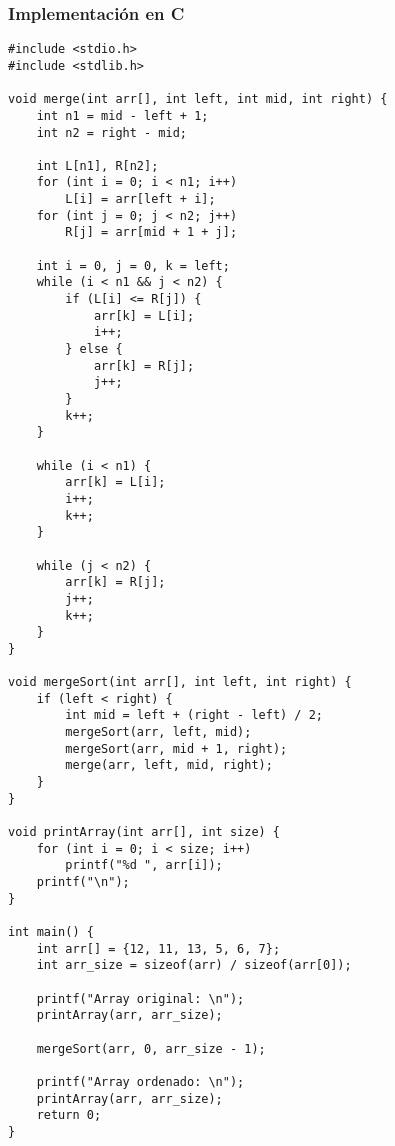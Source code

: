 \documentclass[11pt,openany]{book}
\begin{document}
\subsubsection{Implementación en C}
\lstset{language=C}
\begin{lstlisting}
#include <stdio.h>
#include <stdlib.h>

void merge(int arr[], int left, int mid, int right) {
    int n1 = mid - left + 1;
    int n2 = right - mid;

    int L[n1], R[n2];
    for (int i = 0; i < n1; i++)
        L[i] = arr[left + i];
    for (int j = 0; j < n2; j++)
        R[j] = arr[mid + 1 + j];

    int i = 0, j = 0, k = left;
    while (i < n1 && j < n2) {
        if (L[i] <= R[j]) {
            arr[k] = L[i];
            i++;
        } else {
            arr[k] = R[j];
            j++;
        }
        k++;
    }

    while (i < n1) {
        arr[k] = L[i];
        i++;
        k++;
    }

    while (j < n2) {
        arr[k] = R[j];
        j++;
        k++;
    }
}

void mergeSort(int arr[], int left, int right) {
    if (left < right) {
        int mid = left + (right - left) / 2;
        mergeSort(arr, left, mid);
        mergeSort(arr, mid + 1, right);
        merge(arr, left, mid, right);
    }
}

void printArray(int arr[], int size) {
    for (int i = 0; i < size; i++)
        printf("%d ", arr[i]);
    printf("\n");
}

int main() {
    int arr[] = {12, 11, 13, 5, 6, 7};
    int arr_size = sizeof(arr) / sizeof(arr[0]);

    printf("Array original: \n");
    printArray(arr, arr_size);

    mergeSort(arr, 0, arr_size - 1);

    printf("Array ordenado: \n");
    printArray(arr, arr_size);
    return 0;
}
\end{lstlisting}
\end{document}

